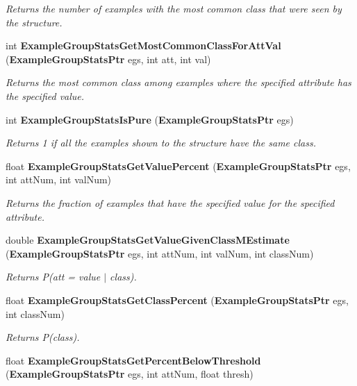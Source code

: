 \begin{CompactItemize}
\begin{CompactList}\small\item\em Returns the number of examples with the most common class that were seen by the structure. \item\end{CompactList}\item 
int {\bf Example\-Group\-Stats\-Get\-Most\-Common\-Class\-For\-Att\-Val} ({\bf Example\-Group\-Stats\-Ptr} egs, int att, int val)
\begin{CompactList}\small\item\em Returns the most common class among examples where the specified attribute has the specified value. \item\end{CompactList}\item 
int {\bf Example\-Group\-Stats\-Is\-Pure} ({\bf Example\-Group\-Stats\-Ptr} egs)
\begin{CompactList}\small\item\em Returns 1 if all the examples shown to the structure have the same class. \item\end{CompactList}\item 
float {\bf Example\-Group\-Stats\-Get\-Value\-Percent} ({\bf Example\-Group\-Stats\-Ptr} egs, int att\-Num, int val\-Num)
\begin{CompactList}\small\item\em Returns the fraction of examples that have the specified value for the specified attribute. \item\end{CompactList}\item 
double {\bf Example\-Group\-Stats\-Get\-Value\-Given\-Class\-MEstimate} ({\bf Example\-Group\-Stats\-Ptr} egs, int att\-Num, int val\-Num, int class\-Num)
\begin{CompactList}\small\item\em Returns P(att = value $|$ class). \item\end{CompactList}\item 
float {\bf Example\-Group\-Stats\-Get\-Class\-Percent} ({\bf Example\-Group\-Stats\-Ptr} egs, int class\-Num)
\begin{CompactList}\small\item\em Returns P(class). \item\end{CompactList}\item 
float {\bf Example\-Group\-Stats\-Get\-Percent\-Below\-Threshold} ({\bf Example\-Group\-Stats\-Ptr} egs, int att\-Num, float thresh)

\end{CompactItemize}
